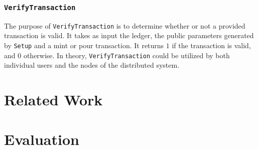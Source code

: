 \documentclass{article}
\begin{document}
\subsubsection{\texttt{VerifyTransaction}}
The purpose of \texttt{VerifyTransaction} is to determine whether or not a provided transaction is valid. It takes as input the ledger, the public parameters generated by \texttt{Setup} and a mint or pour transaction. It returns $1$ if the transaction is valid, and $0$ otherwise. In theory, \texttt{VerifyTransaction} could be utilized by both individual users and the nodes of the distributed system.

\section{Related Work}
\section{Evaluation}

\newpage
\printbibliography
\end{document}
